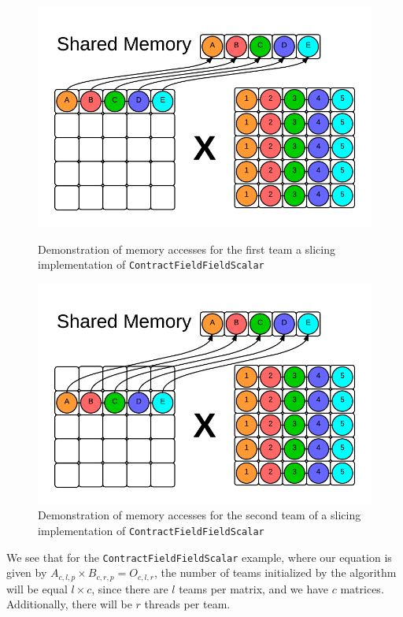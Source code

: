 \begin{figure}[H]
    \centering
    \includegraphics[scale = .55]{ContractFieldFieldScalarGraphic}
    \caption[Memory accesses -- slicing]{Demonstration of memory accesses for the first team a slicing
        implementation of \texttt{ContractFieldFieldScalar}}
    \label{fig:Slicing}

    \includegraphics[scale = .55]{ContractFieldFieldScalarGraphic2}
    \caption[Memory accesses -- slicing]{Demonstration of memory accesses for
    the second team of a slicing implementation of
    \texttt{ContractFieldFieldScalar}}
    \label{fig:Slicing2}
\end{figure}

We see that for the \texttt{ContractFieldFieldScalar} example, where our equation is given by
$A_{c,l,p} \times B_{c, r, p} = O_{c,l, r}$, the
number of teams initialized by the algorithm will be equal $l \times c$,
since there are $l$ teams per matrix, and we have $c$ matrices.
Additionally, there will be $r$ threads per team. 


